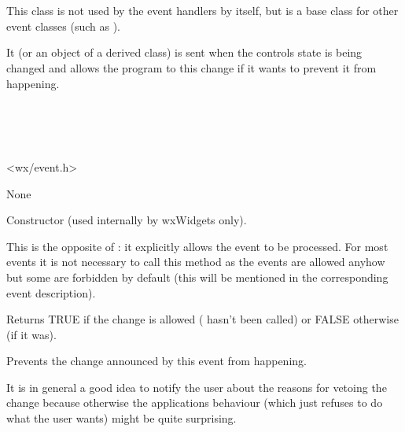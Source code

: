 \section{}\label{wxnotifyevent}

This class is not used by the event handlers by itself, but is a base class
for other event classes (such as ).

It (or an object of a derived class) is sent when the controls state is being
changed and allows the program to  this
change if it wants to prevent it from happening.


\\
\\
\\


<wx/event.h>


None




\label{wxnotifyeventconstr}


Constructor (used internally by wxWidgets only).

\label{wxnotifyeventallow}


This is the opposite of : it explicitly
allows the event to be processed. For most events it is not necessary to call
this method as the events are allowed anyhow but some are forbidden by default
(this will be mentioned in the corresponding event description).

\label{wxnotifyeventisallowed}


Returns TRUE if the change is allowed ( 
hasn't been called) or FALSE otherwise (if it was).

\label{wxnotifyeventveto}


Prevents the change announced by this event from happening.

It is in general a good idea to notify the user about the reasons for vetoing
the change because otherwise the applications behaviour (which just refuses to
do what the user wants) might be quite surprising.

